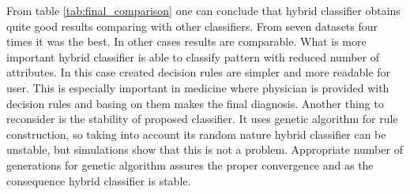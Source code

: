 From table \ref{tab:final_comparison} one can conclude that hybrid classifier
obtains quite good results comparing with other classifiers. From seven
datasets four times it was the best. In other cases results are comparable.
What is more important hybrid classifier is able to classify pattern with
reduced number of attributes. In this case created decision rules are simpler
and more readable for user. This is especially important in medicine where
physician is provided with decision rules and basing on them makes the final
diagnosis. Another thing to reconsider is the stability of proposed classifier.
It uses genetic algorithm for rule construction, so taking into account its
random nature hybrid classifier can be unstable, but simulations show that this
is not a problem. Appropriate number of generations for genetic algorithm
assures the proper convergence and as the consequence hybrid classifier is stable. 
